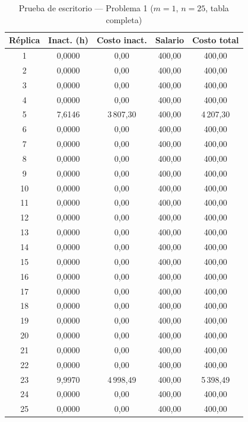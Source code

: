 \documentclass[12pt,a4paper]{article}
\begin{document}
\begin{table}[H]
\centering
\caption{Prueba de escritorio — Problema 1 ($m=1$, $n=25$, tabla completa)}
\small
\begin{tabular}{ccccc}
\toprule
\textbf{Réplica} & \textbf{Inact. (h)} & \textbf{Costo inact.} & \textbf{Salario} & \textbf{Costo total} \\
\midrule
1 & 0,0000 & 0,00 & 400,00 & 400,00 \\
2 & 0,0000 & 0,00 & 400,00 & 400,00 \\
3 & 0,0000 & 0,00 & 400,00 & 400,00 \\
4 & 0,0000 & 0,00 & 400,00 & 400,00 \\
5 & 7,6146 & 3\,807,30 & 400,00 & 4\,207,30 \\
6 & 0,0000 & 0,00 & 400,00 & 400,00 \\
7 & 0,0000 & 0,00 & 400,00 & 400,00 \\
8 & 0,0000 & 0,00 & 400,00 & 400,00 \\
9 & 0,0000 & 0,00 & 400,00 & 400,00 \\
10 & 0,0000 & 0,00 & 400,00 & 400,00 \\
11 & 0,0000 & 0,00 & 400,00 & 400,00 \\
12 & 0,0000 & 0,00 & 400,00 & 400,00 \\
13 & 0,0000 & 0,00 & 400,00 & 400,00 \\
14 & 0,0000 & 0,00 & 400,00 & 400,00 \\
15 & 0,0000 & 0,00 & 400,00 & 400,00 \\
16 & 0,0000 & 0,00 & 400,00 & 400,00 \\
17 & 0,0000 & 0,00 & 400,00 & 400,00 \\
18 & 0,0000 & 0,00 & 400,00 & 400,00 \\
19 & 0,0000 & 0,00 & 400,00 & 400,00 \\
20 & 0,0000 & 0,00 & 400,00 & 400,00 \\
21 & 0,0000 & 0,00 & 400,00 & 400,00 \\
22 & 0,0000 & 0,00 & 400,00 & 400,00 \\
23 & 9,9970 & 4\,998,49 & 400,00 & 5\,398,49 \\
24 & 0,0000 & 0,00 & 400,00 & 400,00 \\
25 & 0,0000 & 0,00 & 400,00 & 400,00 \\
\bottomrule
\end{tabular}
\end{table}
\end{document}
